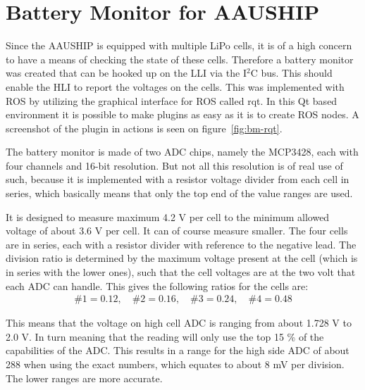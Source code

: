 \chapter{Battery Monitor for AAUSHIP}
\label{ch:bm}


Since the AAUSHIP is equipped with multiple LiPo cells, it is of
a high concern to have a means of checking the state of these cells.
Therefore a battery monitor was created that can be hooked up on the
\ac{LLI} via the I$^2$C bus. This should enable the \ac{HLI} to report
the voltages on the cells. This was implemented with \ac{ROS} by
utilizing the graphical interface for \ac{ROS} called rqt. In this Qt
based environment it is possible to make plugins as easy as it is to
create \ac{ROS} nodes. A screenshot of the plugin in actions is seen
on figure~\vref{fig:bm-rqt}.

The battery monitor is made of two \ac{ADC} chips, namely the MCP3428,
each with four channels and 16-bit resolution. But not all this
resolution is of real use of such, because it is implemented with a
resistor voltage divider from each cell in series, which basically
means that only the top end of the value ranges are used. 

It is designed to measure maximum 4.2 V per cell to the minimum
allowed voltage of about 3.6 V per cell. It can of course measure
smaller. The four cells are in series, each with a resistor divider with
reference to the negative lead. The division ratio is determined by
the maximum voltage present at the cell (which is in series with the
lower ones), such that the cell voltages are at the two volt that
each \ac{ADC} can handle. This gives the following ratios for the
cells are:
\begin{align}
	\#1 = 0.12, \quad \#2 = 0.16, \quad \#3 = 0.24, \quad \#4 = 0.48
\end{align}

This means that the voltage on high cell \ac{ADC} is ranging from
about 1.728 V to 2.0 V. In turn meaning that the reading will only use
the top  15 \% of the capabilities of the \ac{ADC}. This results in a
range for the high side \ac{ADC} of about 288 when using the exact
numbers, which equates to about 8 mV per division. The lower ranges
are more accurate.

